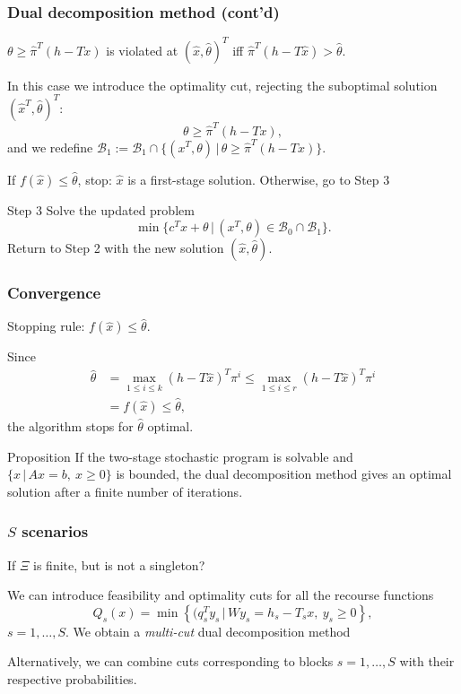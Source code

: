 \documentclass{beamer}
\begin{document}
\begin{frame}
\frametitle{Dual decomposition method (cont'd)}

$\theta \geq \hat{\pi}^T(h-Tx)$ is violated at $(\hat{x}, \hat{\theta})^T$
iff $\hat{\pi}^T(h-T\hat{x}) > \hat{\theta}$.

In this case we introduce the optimality cut, rejecting the suboptimal solution $(\hat{x}^T, \hat{\theta})^T$:
\[
\theta \geq \hat{\pi}^T (h-Tx),
\]
and we redefine $\mathcal{B}_1 := \mathcal{B}_1 \cap \lbrace (x^T,
\theta) \,|\, \theta \geq \hat{\pi}^T (h-Tx) \rbrace$.

\mbox{}

If $f(\hat{x}) \leq \hat{\theta}$, stop: $\hat{x}$ is a first-stage solution.
Otherwise, go to Step 3

\mbox{}

{\red Step 3}
Solve the updated problem
\[
\min \lbrace c^Tx + \theta \,|\, (x^T, \theta) \in \mathcal{B}_0 \cap
\mathcal{B}_1 \rbrace.
\]
Return to Step 2 with the new solution $(\hat{x}, \hat{\theta})$.

\end{frame}

\begin{frame}
\frametitle{Convergence}

{\blue Stopping rule}: $f(\hat{x}) \leq \hat{\theta}$.

Since
\begin{align*}
\hat{\theta} &= \max_{1 \leq i \leq k} (h-T\hat{x})^T\pi^i
\leq \max_{1 \leq i \leq r} (h-T\hat{x})^T\pi^i \\
&= f(\hat{x}) \leq \hat{\theta},
\end{align*}
the algorithm stops for $\hat{\theta}$ optimal.


\begin{block}{Proposition}
If the two-stage stochastic program is solvable and $\lbrace x
\,|\, Ax=b,\ x \geq 0 \rbrace$ is bounded, the dual decomposition method gives an optimal solution after a finite number of iterations.
\end{block}

\end{frame}

\begin{frame}
\frametitle{$S$ scenarios}

If $\Xi$ is finite, but is not a singleton?

\mbox{}

We can introduce feasibility and optimality cuts for all the recourse functions
\[
Q_{s}(x) = \min \left\lbrace (q_{s}^T y_{s} \,|\, Wy_{s} = h_{s}-T_{s}x,\ y_{s} \geq 0 \right\rbrace,
\]
$s = 1,\ldots,S$.
We obtain a {\sl \red multi-cut} dual decomposition method

\mbox{}

Alternatively, we can combine cuts corresponding to blocks $s = 1,\ldots,S$ with their respective probabilities.

\end{frame}
\end{document}
